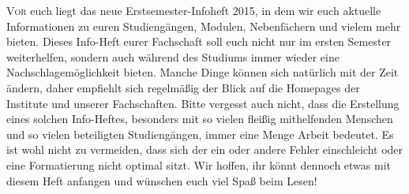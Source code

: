 
\thispagestyle{plain}
\lettrine[lines=3,loversize=0.2,slope=-15,lhang=0.2]{V}{or} euch liegt das neue Erstsemester-Infoheft 2015, in dem wir euch aktuelle Informationen zu euren Studiengängen, Modulen, Nebenfächern und vielem mehr bieten. Dieses Info-Heft eurer Fachschaft soll euch nicht nur im ersten Semester weiterhelfen, sondern auch während des Studiums immer wieder eine Nachschlagemöglichkeit bieten. Manche Dinge können sich natürlich mit der Zeit ändern, daher empfiehlt sich regelmäßig der Blick auf die Homepages der Institute und unserer Fachschaften. Bitte vergesst auch nicht, dass die Erstellung eines solchen Info-Heftes, besonders mit so vielen fleißig mithelfenden Menschen und so vielen beteiligten Studiengängen, immer eine Menge Arbeit bedeutet. Es ist wohl nicht zu vermeiden, dass sich der ein oder andere Fehler einschleicht oder eine Formatierung nicht optimal sitzt. Wir hoffen, ihr könnt dennoch etwas mit diesem Heft anfangen und wünschen euch viel Spaß beim Lesen!

